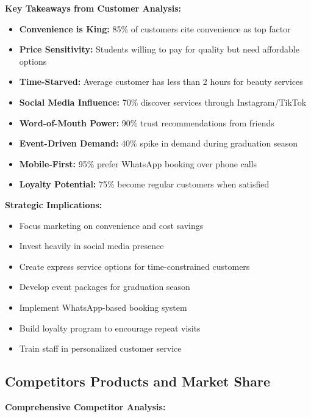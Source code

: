 \documentclass[a4paper,12pt]{article}
\begin{document}
\begin{tcolorbox}[mybox, title=\textbf{Customer Insights Summary}]
\textbf{Key Takeaways from Customer Analysis:}
\begin{itemize}[leftmargin=1em, itemsep=0pt]
    \item \textbf{Convenience is King:} 85\% of customers cite convenience as top factor
    \item \textbf{Price Sensitivity:} Students willing to pay for quality but need affordable options
    \item \textbf{Time-Starved:} Average customer has less than 2 hours for beauty services
    \item \textbf{Social Media Influence:} 70\% discover services through Instagram/TikTok
    \item \textbf{Word-of-Mouth Power:} 90\% trust recommendations from friends
    \item \textbf{Event-Driven Demand:} 40\% spike in demand during graduation season
    \item \textbf{Mobile-First:} 95\% prefer WhatsApp booking over phone calls
    \item \textbf{Loyalty Potential:} 75\% become regular customers when satisfied
\end{itemize}

\textbf{Strategic Implications:}
\begin{itemize}[leftmargin=1em, itemsep=0pt]
    \item Focus marketing on convenience and cost savings
    \item Invest heavily in social media presence
    \item Create express service options for time-constrained customers
    \item Develop event packages for graduation season
    \item Implement WhatsApp-based booking system
    \item Build loyalty program to encourage repeat visits
    \item Train staff in personalized customer service
\end{itemize}
\end{tcolorbox}

\subsection{Competitors Products and Market Share}

\textbf{Comprehensive Competitor Analysis:}
\end{document}
